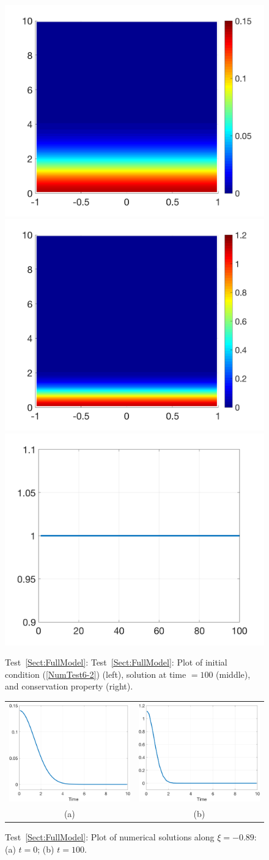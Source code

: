 \documentclass[preprint,11pt]{elsarticle}
\begin{document}
\begin{figure}[H]
\centering
\includegraphics[width=.32\textwidth]{./NumFig/FullModel2D-2-Ini}
\includegraphics[width=.32\textwidth]{./NumFig/FullModel2D-2-100}
\includegraphics[width=.32\textwidth]{./NumFig/FullModel2D-2-Conv}
\caption{Test~\ref{Sect:FullModel}: Test~\ref{Sect:FullModel}: Plot of initial condition (\ref{NumTest6-2}) (left), solution at time $= 100$ (middle), and conservation property (right).}
\end{figure}

\begin{figure}[H]
\centering
\begin{tabular}{cc}
\includegraphics[width=.45\textwidth]{./NumFig/FullModel2D-2-0-cross}
&\includegraphics[width=.45\textwidth]{./NumFig/FullModel2D-100-cross}\\
(a) & (b)
\end{tabular}
\caption{Test~\ref{Sect:FullModel}: Plot of numerical solutions along $\xi = -0.89$: (a) $t=0$; (b) $t=100$.}
\end{figure}
\end{document}
